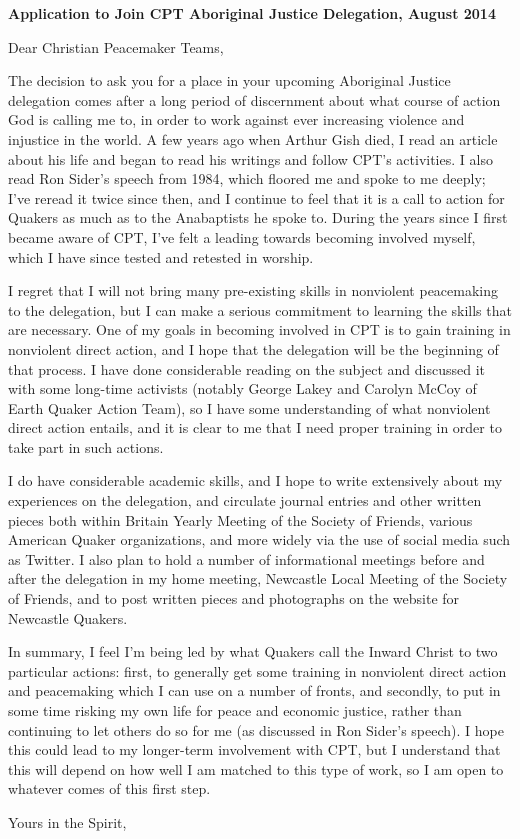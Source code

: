 \documentclass[a4paper,12pt]{letter}
\begin{document}
\begin{letter}{\textbf{Application to Join CPT Aboriginal Justice Delegation, August 2014}}

\opening{Dear Christian Peacemaker Teams,} %

The decision to ask you for a place in your upcoming Aboriginal Justice delegation comes after a long period of discernment about what course of action God is calling me to, in order to work against ever increasing violence and injustice in the world. A few years ago when Arthur Gish died, I read an article about his life and began to read his writings and follow CPT's activities. I also read Ron Sider's speech from 1984, which floored me and spoke to me deeply; I've reread it twice since then, and I continue to feel that it is a call to action for Quakers as much as to the Anabaptists he spoke to. During the years since I first became aware of CPT, I've felt a leading towards becoming involved myself, which I have since tested and retested in worship.

I regret that I will not bring many pre-existing skills in nonviolent peacemaking to the delegation, but I can make a serious commitment to learning the skills that are necessary. One of my goals in becoming involved in CPT is to gain training in nonviolent direct action, and I hope that the delegation will be the beginning of that process. I have done considerable reading on the subject and discussed it with some long-time activists (notably George Lakey and Carolyn McCoy of Earth Quaker Action Team), so I have some understanding of what nonviolent direct action entails, and it is clear to me that I need proper training in order to take part in such actions.

I do have considerable academic skills, and I hope to write extensively about my experiences on the delegation, and circulate journal entries and other written pieces both within Britain Yearly Meeting of the Society of Friends, various American Quaker organizations, and more widely via the use of social media such as Twitter. I also plan to hold a number of informational meetings before and after the delegation in my home meeting, Newcastle Local Meeting of the Society of Friends, and to post written pieces and photographs on the website for Newcastle Quakers.

In summary, I feel I'm being led by what Quakers call the Inward Christ to two particular actions: first, to generally get some training in nonviolent direct action and peacemaking which I can use on a number of fronts, and secondly, to put in some time risking my own life for peace and economic justice, rather than continuing to let others do so for me (as discussed in Ron Sider's speech). I hope this could lead to my longer-term involvement with CPT, but I understand that this will depend on how well I am matched to this type of work, so I am open to whatever comes of this first step.




\closing{Yours in the Spirit,} %


\end{letter}
\end{document}
